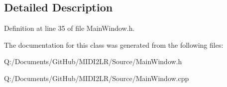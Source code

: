 \subsection{Detailed Description}


Definition at line 35 of file Main\+Window.\+h.



The documentation for this class was generated from the following files\+:\begin{DoxyCompactItemize}
\item 
Q\+:/\+Documents/\+Git\+Hub/\+M\+I\+D\+I2\+L\+R/\+Source/Main\+Window.\+h\item 
Q\+:/\+Documents/\+Git\+Hub/\+M\+I\+D\+I2\+L\+R/\+Source/Main\+Window.\+cpp\end{DoxyCompactItemize}
